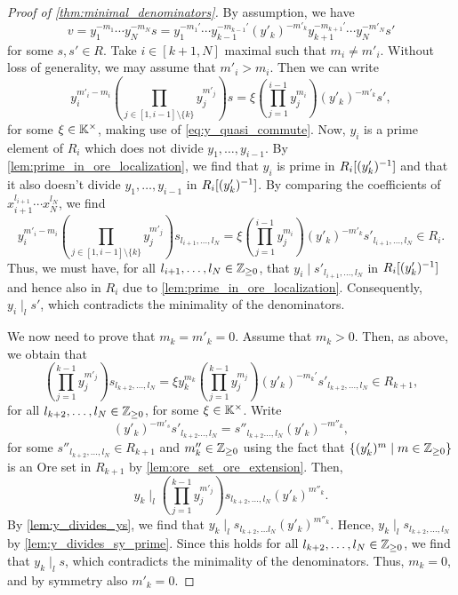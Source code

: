 \begin{proof}[Proof of \cref{thm:minimal_denominators}]
	By assumption, we have
	\begin{equation*}
		v = y_1^{-m_1}\cdots y_N^{-m_N} s = y_1^{-m_1'} \cdots y_{k-1}^{-m_{k-1}'}(y'_k)^{-m'_k}y_{k+1}^{-m_{k+1}'}\cdots y_N^{-m'_N}s'
	\end{equation*}
	for some $s, s' \in R$. Take $i\in [k+1, N]$ maximal such that $m_i \neq m'_i$. Without
	loss of generality, we may assume that $m'_i > m_i$. Then we can write
	\begin{equation*}
		y_i^{m'_i - m_i}\left(\prod_{j\in [1, i-1] \setminus \{k\}}y_j^{m'_j}\right)s = \xi \left(\prod_{j = 1}^{i-1}y_j^{m_i}\right)(y'_k)^{-m'_k} s',
	\end{equation*}
	for some $\xi \in \mathbb{K}^\times$, making use of \cref{eq:y_quasi_commute}. Now, $y_i$ is
	a prime element of $R_i$ which does not divide $y_1, \dots, y_{i-1}$. By
	\cref{lem:prime_in_ore_localization}, we find that $y_i$ is prime in $R_i[(y'_k)^{-1}]$
	and that it also doesn't divide $y_1, \dots, y_{i-1}$ in $R_i[(y'_k)^{-1}]$. By
	comparing the coefficients of $x_{i+1}^{l_{i+1}}\cdots x_N^{l_N}$, we find
	\begin{equation*}
		y_i^{m'_i - m_i}\left(\prod_{j\in [1, i-1] \setminus \{k\}}y_j^{m'_j}\right)s_{l_{i+1},\dots, l_N} = \xi \left(\prod_{j = 1}^{i-1}y_j^{m_i}\right)(y'_k)^{-m'_k} s'_{l_{i+1}, \dots, l_N} \in R_i.
	\end{equation*}
	Thus, we must have, for all $l_{i+1}, \dots, l_N \in \mathbb{Z}_{\geq 0}$, that $y_i \mid
		s'_{l_{i+1}, \dots, l_N}$ in $R_i[(y'_k)^{-1}]$ and hence also in $R_i$ due to
	\cref{lem:prime_in_ore_localization}. Consequently, $y_i \mid_l s'$, which contradicts
	the minimality of the denominators.

	We now need to prove that $m_k = m'_k = 0$. Assume that $m_k > 0$. Then, as above, we
	obtain that
	\begin{equation*}
		\left(\prod_{j=1}^{k-1}y_j^{m'_j}\right)s_{l_{k+2}, \dots, l_N} = \xi y_k^{m_k}\left(\prod_{j=1}^{k-1}y_j^{m_j}\right)(y'_k)^{-m_k'}s'_{l_{k+2}, \dots, l_N} \in R_{k+1},
	\end{equation*}
	for all $l_{k+2}, \dots, l_N \in \mathbb{Z}_{\geq 0}$, for some $\xi \in \mathbb{K}^\times$. Write
	\begin{equation*}
		(y'_k)^{-m'_s}s'_{l_{k+2}\dots, l_N} = s''_{l_{k+2}\dots, l_N}(y'_k)^{-m''_k},
	\end{equation*}
	for some $s''_{l_{k+2}, \dots, l_N} \in R_{k+1}$ and $m''_k \in \mathbb{Z}_{\geq 0}$ using
	the fact that $\{(y'_k)^m \mid m \in \mathbb{Z}_{\geq 0}\}$ is an Ore set in $R_{k+1}$ by
	\cref{lem:ore_set_ore_extension}. Then,
	\begin{equation*}
		y_k \mid_l \left(\prod_{j=1}^{k-1}y_j^{m'_j}\right)s_{l_{k+2}, \dots, l_N}(y'_k)^{m''_k}.
	\end{equation*}
	By \cref{lem:y_divides_ys}, we find that $y_k \mid_l s_{l_{k+2}, \dots
				l_N}(y'_k)^{m''_k}$. Hence, $y_k \mid_l s_{l_{k+2}, \dots, l_N}$ by
	\cref{lem:y_divides_sy_prime}. Since this holds for all $l_{k+2}, \dots, l_N \in
		\mathbb{Z}_{\geq 0}$, we find that $y_k \mid_l s$, which contradicts the minimality of the
	denominators. Thus, $m_k = 0$, and by symmetry also $m'_k = 0$.


\end{proof}
